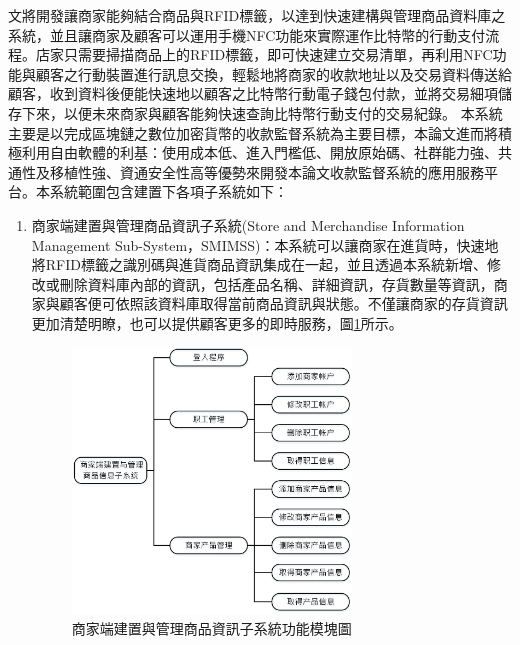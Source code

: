 	文將開發讓商家能夠結合商品與RFID標籤，以達到快速建構與管理商品資料庫之系統，並且讓商家及顧客可以運用手機NFC功能來實際運作比特幣的行動支付流程。店家只需要掃描商品上的RFID標籤，即可快速建立交易清單，再利用NFC功能與顧客之行動裝置進行訊息交換，輕鬆地將商家的收款地址以及交易資料傳送給顧客，收到資料後便能快速地以顧客之比特幣行動電子錢包付款，並將交易細項儲存下來，以便未來商家與顧客能夠快速查詢比特幣行動支付的交易紀錄。
	本系統主要是以完成區塊鏈之數位加密貨幣的收款監督系統為主要目標，本論文進而將積極利用自由軟體的利基：使用成本低、進入門檻低、開放原始碼、社群能力強、共通性及移植性強、資通安全性高等優勢來開發本論文收款監督系統的應用服務平台。本系統範圍包含建置下各項子系統如下：
		\begin{enumerate}
		\item 商家端建置與管理商品資訊子系統(Store and Merchandise Information Management Sub-System，SMIMSS)：本系統可以讓商家在進貨時，快速地將RFID標籤之識別碼與進貨商品資訊集成在一起，並且透過本系統新增、修改或刪除資料庫內部的資訊，包括產品名稱、詳細資訊，存貨數量等資訊，商家與顧客便可依照該資料庫取得當前商品資訊與狀態。不僅讓商家的存貨資訊更加清楚明瞭，也可以提供顧客更多的即時服務，圖\ref{model1}所示。

			\begin{figure}[htbp]
			\centering
			\includegraphics[width = 0.7\textwidth]{model1.jpg}
			\caption{商家端建置與管理商品資訊子系統功能模塊圖}\label{model1}
			\end{figure}




\end{enumerate}
